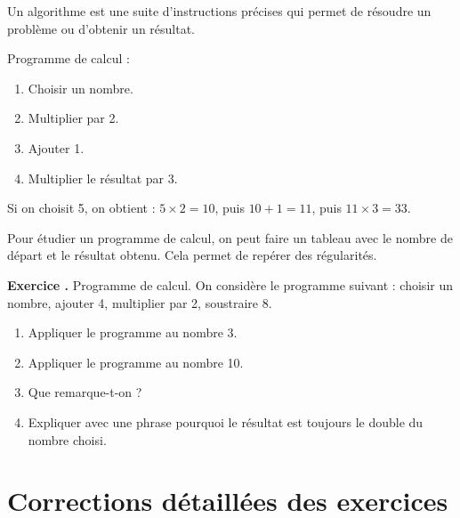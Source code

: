 \documentclass[11pt,a4paper]{article}
\newcounter{exo}
\newcommand{\exercice}[1]{\refstepcounter{exo}\begin{exobox}\textbf{Exercice \theexo.} #1\end{exobox}}
\begin{document}
\begin{definitionbox}
Un algorithme est une suite d'instructions précises qui permet de résoudre un problème ou d'obtenir un résultat.
\end{definitionbox}

\begin{exemplebox}
Programme de calcul :
\begin{enumerate}[label=\arabic*)]
\item Choisir un nombre.
\item Multiplier par 2.
\item Ajouter 1.
\item Multiplier le résultat par 3.
\end{enumerate}
Si on choisit 5, on obtient : \(5\times2=10\), puis \(10+1=11\), puis \(11\times3=33\).
\end{exemplebox}

\begin{methodbox}
Pour étudier un programme de calcul, on peut faire un tableau avec le nombre de départ et le résultat obtenu. Cela permet de repérer des régularités.
\end{methodbox}

\exercice{Programme de calcul.
On considère le programme suivant : choisir un nombre, ajouter 4, multiplier par 2, soustraire 8.
\begin{enumerate}[label=\alph*)]
\item Appliquer le programme au nombre 3.
\item Appliquer le programme au nombre 10.
\item Que remarque-t-on ?
\item Expliquer avec une phrase pourquoi le résultat est toujours le double du nombre choisi.
\end{enumerate}}

\newpage
\section{Corrections détaillées des exercices}
\end{document}
